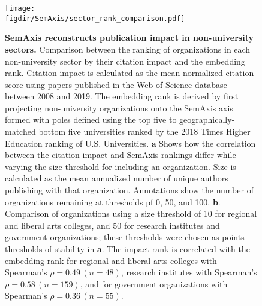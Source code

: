 \documentclass[12pt]{article} %
\def\figdir{../Figs}
\begin{document}
%
%
\begin{figure}[hp!]
	\centering
	\texttt{[image: \\figdir/SemAxis/sector\_rank\_comparison.pdf]}
	\caption{
		\textbf{SemAxis reconstructs publication impact in non-university sectors.}
		Comparison between the ranking of organizations in each non-university sector by their citation impact and the embedding rank.
		Citation impact is calculated as the mean-normalized citation score using papers published in the Web of Science database between 2008 and 2019. 
		The embedding rank is derived by first projecting non-university organizations onto the SemAxis axis formed with poles defined using the top five to geographically-matched bottom five universities ranked by the 2018 Times Higher Education ranking of U.S. Universities.
		\textbf{a} Shows how the correlation between the citation impact and SemAxis rankings differ while varying the size threshold for including an organization.
		Size is calculated as the mean annualized number of unique authors publishing with that organization. 
		Annotations show the number of organizations remaining at thresholds pf 0, 50, and 100. 
		\textbf{b}. Comparison of organizations using a size threshold of 10 for regional and liberal arts colleges, and 50 for research institutes and government organizations;
		these thresholds were chosen as points thresholds of stability in \textbf{a}. 		
		The impact rank is correlated with the embedding rank for regional and liberal arts colleges with Spearman's $\rho = 0.49\,(n = 48)$, research institutes with Spearman's $\rho = 0.58\,(n = 159)$, and for government organizations with Spearman's $\rho = 0.36\,(n = 55)$. 
	}
	\label{fig:supp:sector_semaxis_impact}
\end{figure}


%
%
\end{document}
